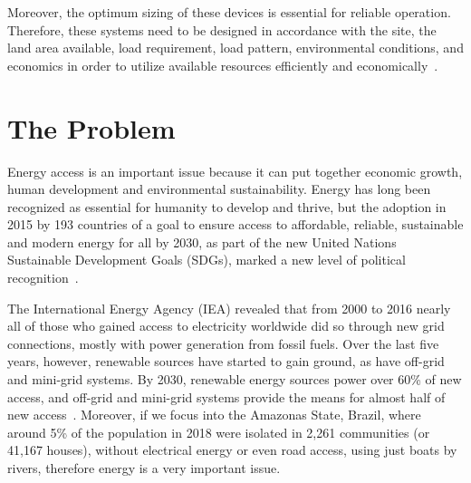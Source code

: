 Moreover, the optimum sizing of these devices is essential for reliable operation. Therefore, these systems need to be designed in accordance with the site, the land area available, load requirement, load pattern, environmental conditions, and economics in order to utilize available resources efficiently and economically~\cite{Rawat}.

\section{The Problem}
%
%

Energy access is an important issue because it can put together economic growth, human development and environmental sustainability. Energy has long been recognized as essential for humanity to develop and thrive, but the adoption in 2015 by 193 countries of a goal to ensure access to affordable, reliable, sustainable and modern energy for all by 2030, as part of the new United Nations Sustainable Development Goals (SDGs), marked a new level of political recognition~\cite{IEAweo2018}.

The International Energy Agency (IEA) revealed that from 2000 to 2016 nearly all of those who gained access to electricity worldwide did so through new grid connections, mostly with power generation from fossil fuels. Over the last five years, however, renewable sources have started to gain ground, as have off-grid and mini-grid systems. By 2030, renewable energy sources power over 60\% of new access, and off-grid and mini-grid systems provide the means for almost half of new access~\cite{IEAweo2018}. Moreover, if we focus into the Amazonas State, Brazil, where around 5\% of the population in 2018 were isolated in 2,261 communities (or 41,167 houses), without electrical energy or even road access, using just boats by rivers, therefore energy is a very important issue. 

